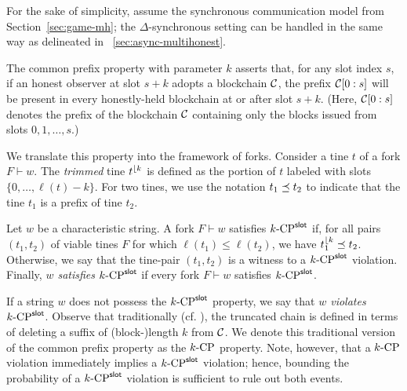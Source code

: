   For the sake of simplicity, 
  assume the synchronous communication model from Section~\ref{sec:game-mh}; 
  the $\Delta$-synchronous setting can be handled in the same way 
  as delineated in \Section~\ref{sec:async-multihonest}.

  The common prefix property with parameter $k$ asserts
  that, for any slot index $s$, if an honest observer at slot $s + k$
  adopts a blockchain $\mathcal{C}$, the prefix $\mathcal{C}[0 : s]$ will be
  present in every honestly-held blockchain at or after slot $s + k$.
  (Here, $\mathcal{C}[0 : s]$ denotes the prefix of the blockchain $\mathcal{C}$
  containing only the blocks issued from slots $0, 1, \ldots, s$.)

  We translate this property into the framework of forks.  Consider a
  tine $t$ of a fork $F \vdash w$.  The \emph{trimmed} tine
  $t^{\lfloor {k}}$ is defined as the portion of $t$ labeled with slots
  $\{ 0, \ldots, \ell(t) - k\}$. For two tines, we use the notation
  $t_1 \preceq t_2$ to indicate that the tine $t_1$ is a
  prefix of tine $t_2$.

  \begin{definition}\label{def:cp-slot-mh}
    Let $w$ be a characteristic string. A fork $F \vdash w$ satisfies
    ${k}\text{-}\mathrm{CP}^{\mathsf{slot}}$ if, for all pairs $(t_1, t_2)$ of viable tines $F$ for
    which $\ell(t_1) \leq \ell(t_2)$, we have $t_1^{\lfloor {k}} \preceq t_2$. 
    Otherwise, we say that the tine-pair $(t_1, t_2)$ is a witness to a ${k}\text{-}\mathrm{CP}^{\mathsf{slot}}$ violation.
    Finally, \emph{$w$ satisfies ${k}\text{-}\mathrm{CP}^{\mathsf{slot}}$} if every fork $F \vdash w$ satisfies ${k}\text{-}\mathrm{CP}^{\mathsf{slot}}$.
  \end{definition} 
  If a string $w$ does not possess the ${k}\text{-}\mathrm{CP}^{\mathsf{slot}}$ property, 
  we say that \emph{$w$ violates ${k}\text{-}\mathrm{CP}^{\mathsf{slot}}$}.
  Observe that traditionally
  (cf. \cite{GKL17}), 
  the truncated chain 
  is defined in terms of
  deleting a suffix of (block-)length $k$ from $\mathcal{C}$. 
  We denote this traditional version of the common prefix property as the
  ${k}\text{-}\mathrm{CP}$ property. Note, however, that a ${k}\text{-}\mathrm{CP}$ violation immediately
  implies a ${k}\text{-}\mathrm{CP}^{\mathsf{slot}}$ violation; hence, bounding the probability of a
  ${k}\text{-}\mathrm{CP}^{\mathsf{slot}}$ violation is sufficient to rule out both events.


